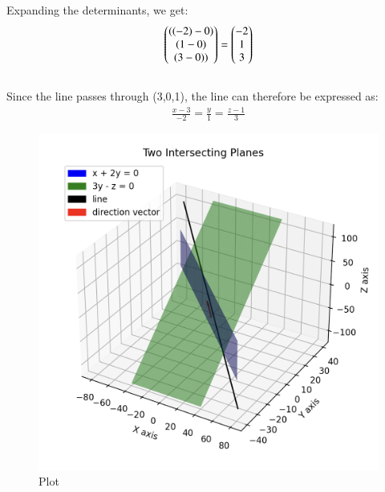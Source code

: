 \documentclass[12pt]{article}
\begin{document}
Expanding the determinants, we get: \begin{align}
\begin{pmatrix} ((-2) - 0) \\ (1-0)  \\ (3-0))\end{pmatrix} = \begin{pmatrix}-2\\1\\3\end{pmatrix} \end{align}\\ 

Since the line passes through (3,0,1), the line can therefore be expressed as: \\
\begin{align}
\frac{x-3}{-2} = \frac{y}{1} = \frac{z-1}{3}
\end{align} 

\begin{figure}[H]
    \centering
    \includegraphics[width=0.9\columnwidth]{Figs/Plot7.png}
    \caption{Plot}
    \label{fig:placeholder}
\end{figure}
\end{document}
